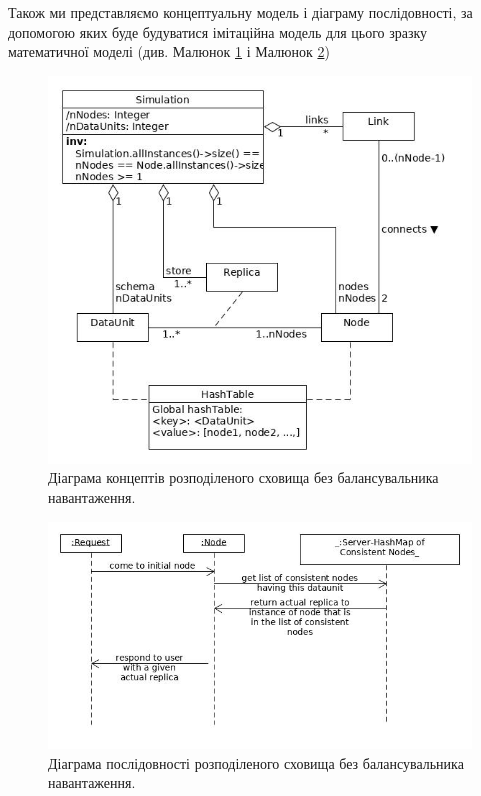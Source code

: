 \documentclass[14pt]{vakthesis}
\begin{document}
Також ми представляємо концептуальну модель і діаграму послідовності, за допомогою яких буде будуватися імітаційна модель для цього зразку математичної моделі (див. Малюнок \ref{fig:d_concepts_without_lb} і Малюнок \ref{fig:d_sequence_without_lb})
\begin{figure}
\centering

\includegraphics[width=\linewidth]{images/d_concept_without_lb.jpg}
     \caption{Діаграма концептів розподіленого сховища без балансувальника навантаження.}
     \label{fig:d_concepts_without_lb}
\end{figure}


\begin{figure}
\centering

\includegraphics[width=\linewidth]{images/d_sequence_without_lb.jpg}
     \caption{Діаграма послідовності розподіленого сховища без балансувальника навантаження.}
     \label{fig:d_sequence_without_lb}
\end{figure}
\end{document}
